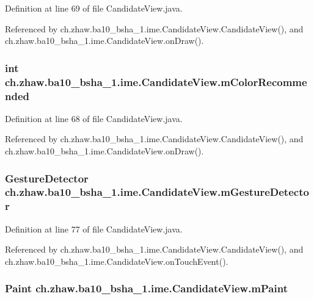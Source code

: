 Definition at line 69 of file CandidateView.java.

Referenced by ch.zhaw.ba10\_\-bsha\_\-1.ime.CandidateView.CandidateView(), and ch.zhaw.ba10\_\-bsha\_\-1.ime.CandidateView.onDraw().\hypertarget{classch_1_1zhaw_1_1ba10__bsha__1_1_1ime_1_1CandidateView_a81a1c0185059c585e32c263c6cbdd517}{
\subsubsection[{mColorRecommended}]{\setlength{\rightskip}{0pt plus 5cm}int {\bf ch.zhaw.ba10\_\-bsha\_\-1.ime.CandidateView.mColorRecommended}}}
\label{classch_1_1zhaw_1_1ba10__bsha__1_1_1ime_1_1CandidateView_a81a1c0185059c585e32c263c6cbdd517}


Definition at line 68 of file CandidateView.java.

Referenced by ch.zhaw.ba10\_\-bsha\_\-1.ime.CandidateView.CandidateView(), and ch.zhaw.ba10\_\-bsha\_\-1.ime.CandidateView.onDraw().\hypertarget{classch_1_1zhaw_1_1ba10__bsha__1_1_1ime_1_1CandidateView_a4baceb8886b2f5203241dcfd69663344}{
\subsubsection[{mGestureDetector}]{\setlength{\rightskip}{0pt plus 5cm}GestureDetector {\bf ch.zhaw.ba10\_\-bsha\_\-1.ime.CandidateView.mGestureDetector}}}
\label{classch_1_1zhaw_1_1ba10__bsha__1_1_1ime_1_1CandidateView_a4baceb8886b2f5203241dcfd69663344}


Definition at line 77 of file CandidateView.java.

Referenced by ch.zhaw.ba10\_\-bsha\_\-1.ime.CandidateView.CandidateView(), and ch.zhaw.ba10\_\-bsha\_\-1.ime.CandidateView.onTouchEvent().\hypertarget{classch_1_1zhaw_1_1ba10__bsha__1_1_1ime_1_1CandidateView_a7dec4379f982d454cb80cf4f1e1c664e}{
\subsubsection[{mPaint}]{\setlength{\rightskip}{0pt plus 5cm}Paint {\bf ch.zhaw.ba10\_\-bsha\_\-1.ime.CandidateView.mPaint}}}
\label{classch_1_1zhaw_1_1ba10__bsha__1_1_1ime_1_1CandidateView_a7dec4379f982d454cb80cf4f1e1c664e}


